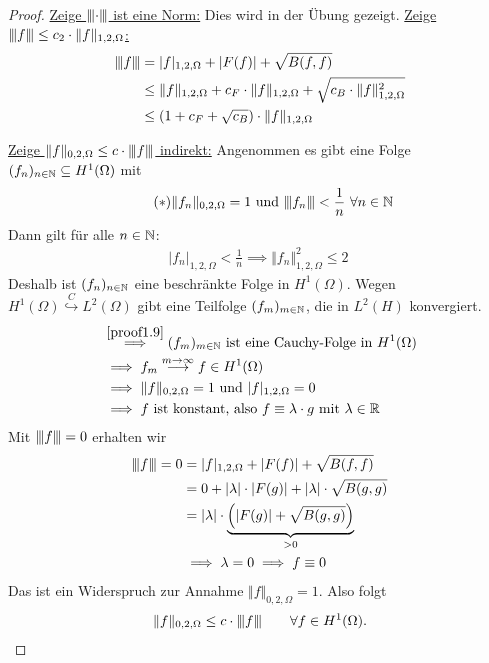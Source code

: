 \begin{proof}
	\underline{Zeige ${\left\vert\kern-0.25ex\left\vert\kern-0.25ex\left\vert \cdot \right\vert\kern-0.25ex\right\vert\kern-0.25ex\right\vert}$ ist eine Norm:}
	Dies wird in der Übung gezeigt.\nl
	\underline{Zeige ${\left\vert\kern-0.25ex\left\vert\kern-0.25ex\left\vert f \right\vert\kern-0.25ex\right\vert\kern-0.25ex\right\vert}\leq c_2\cdot\Vert f\Vert_{1,2,\Omega}$:}
	\begin{align*}
		{\left\vert\kern-0.25ex\left\vert\kern-0.25ex\left\vert f \right\vert\kern-0.25ex\right\vert\kern-0.25ex\right\vert} &=
		|f|_{1,2,\Omega}+|F(f)|+\sqrt{B(f,f)}\\
		&\leq
		\Vert f\Vert_{1,2,\Omega} +c_F\cdot\Vert f\Vert_{1,2,\Omega}+\sqrt{c_B\cdot\Vert f\Vert^2_{1,2,\Omega}}\\
		&\leq
		(1+c_F+\sqrt{c_B})\cdot\Vert f\Vert_{1,2,\Omega}
	\end{align*}

	\underline{Zeige $\Vert f\Vert_{0,2,\Omega}\leq c\cdot{\left\vert\kern-0.25ex\left\vert\kern-0.25ex\left\vert f \right\vert\kern-0.25ex\right\vert\kern-0.25ex\right\vert}$ indirekt:}
	Angenommen es gibt eine Folge $(f_n)_{n\in\mathbb{N}}\subseteq H^1(\Omega)$ mit
	\begin{align}\label{proof1.9}\tag{$\ast$}
		\Vert f_n\Vert_{0,2,\Omega}=1\text{ und }{\left\vert\kern-0.25ex\left\vert\kern-0.25ex\left\vert f_n \right\vert\kern-0.25ex\right\vert\kern-0.25ex\right\vert}<\frac{1}{n}~\forall n\in\mathbb{N}
	\end{align}
	Dann gilt für alle $n\in\mathbb{N}$:
	\begin{align*}
		|f_n|_{1,2,\Omega}<\frac{1}{n}
		\implies
		\Vert f_n\Vert^2_{1,2,\Omega}\leq 2\
	\end{align*}
	Deshalb ist $(f_n)_{n\in\mathbb{N}}$ eine beschränkte Folge in $H^1(\Omega)$. 
	Wegen $H^1(\Omega)\stackrel{C}{\hookrightarrow} L^2(\Omega)$ gibt eine Teilfolge $(f_m)_{m\in\mathbb{N}}$, die in $L^2(H)$ konvergiert.
	\begin{align*}
		&\stackrel{\eqref{proof1.9}}{\implies}
		(f_m)_{m\in\mathbb{N}}\text{ ist eine Cauchy-Folge in }H^1(\Omega)\\
		&\implies
		f_m\stackrel{m\to\infty}{\longrightarrow} f\in H^1(\Omega)\\
		&\implies
		\Vert f\Vert_{0,2,\Omega}=1\text{ und } |f|_{1,2,\Omega}=0\\
		&\implies
		f\text{ ist konstant, also } f\equiv \lambda\cdot g\text{ mit }\lambda\in\mathbb{R}
	\end{align*}
	Mit ${\left\vert\kern-0.25ex\left\vert\kern-0.25ex\left\vert f \right\vert\kern-0.25ex\right\vert\kern-0.25ex\right\vert}=0$ erhalten wir
	\begin{align*}
		{\left\vert\kern-0.25ex\left\vert\kern-0.25ex\left\vert f \right\vert\kern-0.25ex\right\vert\kern-0.25ex\right\vert} = 0 
		&=|f|_{1,2,\Omega}+|F(f)|+\sqrt{B(f,f)}\\
		&=0+|\lambda|\cdot|F(g)|+|\lambda|\cdot\sqrt{B(g,g)}\\
		&=|\lambda|\cdot\underbrace{\Big(|F(g)|+\sqrt{B(g,g)}\Big)}_{>0}\\
		&\implies\lambda=0\implies f\equiv 0
	\end{align*}
	Das ist ein Widerspruch zur Annahme $\Vert f\Vert_{0,2,\Omega}=1$. 
	Also folgt
	\begin{align*}
		\Vert f\Vert_{0,2,\Omega}\leq c\cdot{\left\vert\kern-0.25ex\left\vert\kern-0.25ex\left\vert f \right\vert\kern-0.25ex\right\vert\kern-0.25ex\right\vert}\qquad\forall f\in H^1(\Omega).
	\end{align*}


\end{proof}
